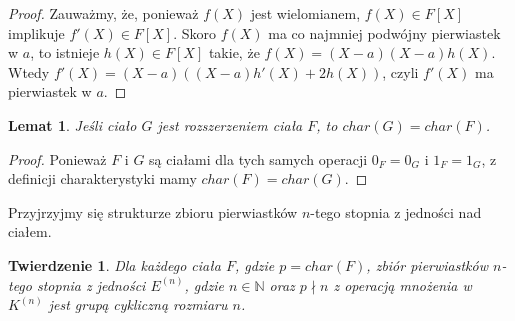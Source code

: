 \documentclass[polish,declaration,shortabstract]{iithesis}
\theoremstyle{definition}
\theoremstyle{remark} \newtheorem{observation}{Obserwacja}
\theoremstyle{plain} \newtheorem{theorem}{Twierdzenie}
\theoremstyle{plain} \newtheorem{lemma}{Lemat}
\theoremstyle{remark} \newtheorem*{remark*}{Uwaga}
\theoremstyle{reminder} \newtheorem*{reminder*}{Przypomnienie}
\begin{document}
\begin{proof}
	Zauważmy, że, ponieważ $f(X)$ jest wielomianem, $f(X) \in F[X]$ implikuje $f'(X) \in F[X]$. Skoro $f(X)$ ma co najmniej podwójny pierwiastek w $a$, to istnieje $h(X) \in F[X]$ takie, że $f(X) = (X - a)(X - a)h(X)$. Wtedy $f'(X) = (X - a)((X - a)h'(X) + 2h(X))$, czyli $f'(X)$ ma pierwiastek w $a$.
\end{proof}
	
\begin{lemma}\label{char1}
	Jeśli ciało $G$ jest rozszerzeniem ciała $F$, to $char(G)=char(F)$.
\end{lemma}
	
\begin{proof}
	Ponieważ $F$ i $G$ są ciałami dla tych samych operacji $0_F=0_G$ i $1_F = 1_G$, z definicji charakterystyki mamy $char(F) = char(G)$.
\end{proof}

Przyjrzyjmy się strukturze zbioru pierwiastków $n$-tego stopnia z jedności nad ciałem. 
	
\begin{theorem}
	Dla każdego ciała $F$, gdzie $p = char(F)$, zbiór pierwiastków $n$-tego stopnia z jedności $E^{(n)}$, gdzie $n \in \mathbb{N}$ oraz $p \nmid n$ z operacją mnożenia w $K^{(n)}$ jest grupą cykliczną rozmiaru $n$.
\end{theorem}
	
\end{document}
